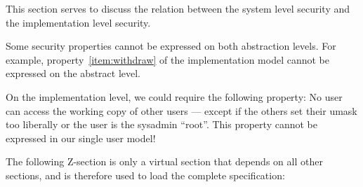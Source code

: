 This section serves to discuss the relation between the system level security
and the implementation level security.

Some security properties cannot be expressed on both abstraction levels.  For
example, property~\ref{item:withdraw} of the implementation model cannot be
expressed on the abstract level.

On the implementation level, we could require the following property: No user
can access the working copy of other users --- except if the others set their
umask too liberally or the user is the sysadmin ``root''.  This property cannot
be expressed in our single user model!



\vspace{4ex} The following Z-section is only a virtual section that depends on
all other sections, and is therefore used to load the complete specification: \\


